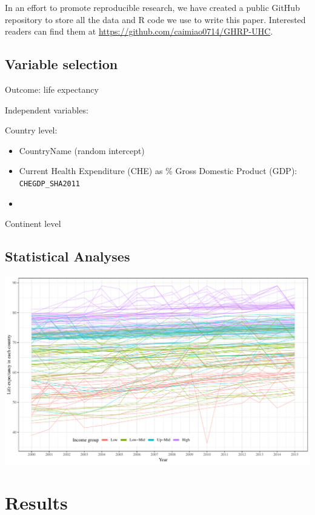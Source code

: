 \documentclass[]{elsarticle} %
\makeatletter
\def\maxwidth{\ifdim\Gin@nat@width>\linewidth\linewidth
\else\Gin@nat@width\fi}
\let\Oldincludegraphics\includegraphics
\renewcommand{\includegraphics}[1]{\Oldincludegraphics[width=\maxwidth]{#1}}
\makeatother
\begin{document}
In an effort to promote reproducible research, we have created a public GitHub repository to store all the data and R code we use to write this paper.
Interested readers can find them at \url{https://github.com/caimiao0714/GHRP-UHC}.

\hypertarget{variable-selection}{%
\subsection{Variable selection}\label{variable-selection}}

Outcome: life expectancy

Independent variables:

Country level:

\begin{itemize}
\item
  CountryName (random intercept)
\item
  Current Health Expenditure (CHE) as \% Gross Domestic Product (GDP): \texttt{CHEGDP\_SHA2011}
\item
\end{itemize}

Continent level

\hypertarget{statistical-analyses}{%
\subsection{Statistical Analyses}\label{statistical-analyses}}

\includegraphics{Figures/fig1.pdf}

\hypertarget{results}{%
\section{Results}\label{results}}
\end{document}

